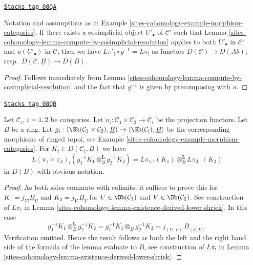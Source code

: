 \begin{lemma}
\label{sites-cohomology-lemma-get-it-now}
\href{https://stacks.math.columbia.edu/tag/08QA}{\texttt{Stacks tag 08QA}}

Notation and assumptions as in Example \ref{sites-cohomology-example-morphism-categories}.
If there exists a cosimplicial object $U'_\bullet$ of $\mathcal{C}'$
such that Lemma \ref{sites-cohomology-lemma-compute-by-cosimplicial-resolution}
applies to both $U'_\bullet$ in $\mathcal{C}'$
and $u(U'_\bullet)$ in $\mathcal{C}$, then we have
$L\pi'_! \circ g^{-1} = L\pi_!$ as functors
$D(\mathcal{C}) \to D(\textit{Ab})$,
resp.\ $D(\mathcal{C}, \underline{B}) \to D(B)$.
\end{lemma}

\begin{proof}
Follows immediately from
Lemma \ref{sites-cohomology-lemma-compute-by-cosimplicial-resolution}
and the fact that $g^{-1}$ is given by precomposing with $u$.
\end{proof}

\begin{lemma}
\label{sites-cohomology-lemma-product-categories}
\href{https://stacks.math.columbia.edu/tag/08QB}{\texttt{Stacks tag 08QB}}

Let $\mathcal{C}_i$, $i = 1, 2$ be categories. Let
$u_i : \mathcal{C}_1 \times \mathcal{C}_2 \to \mathcal{C}_i$ be the
projection functors. Let $B$ be a ring. Let
$g_i : (\Sh(\mathcal{C}_1 \times \mathcal{C}_2), \underline{B}) \to
(\Sh(\mathcal{C}_i), \underline{B})$ be the corresponding morphisms
of ringed topoi, see Example \ref{sites-cohomology-example-morphism-categories}. For
$K_i \in D(\mathcal{C}_i, B)$ we have
$$
L(\pi_1 \times \pi_2)_!(
g_1^{-1}K_1 \otimes_{\underline{B}}^\mathbf{L} g_2^{-1}K_2)
=
L\pi_{1, !}(K_1) \otimes_B^\mathbf{L} L\pi_{2, !}(K_2)
$$
in $D(B)$ with obvious notation.
\end{lemma}

\begin{proof}
As both sides commute with colimits, it suffices to prove this for
$K_1 = j_{U!}\underline{B}_U$ and $K_2 = j_{V!}\underline{B}_V$
for $U \in \Ob(\mathcal{C}_1)$ and $V \in \Ob(\mathcal{C}_2)$.
See construction of $L\pi_!$ in
Lemma \ref{sites-cohomology-lemma-existence-derived-lower-shriek}.
In this case
$$
g_1^{-1}K_1 \otimes_{\underline{B}}^\mathbf{L} g_2^{-1}K_2 =
g_1^{-1}K_1 \otimes_{\underline{B}} g_2^{-1}K_2 =
j_{(U, V)!}\underline{B}_{(U, V)}
$$
Verification omitted. Hence the result follows as both the left and
the right hand side of the formula of the lemma evaluate to $B$, see
construction of $L\pi_!$ in Lemma \ref{sites-cohomology-lemma-existence-derived-lower-shriek}.
\end{proof}


